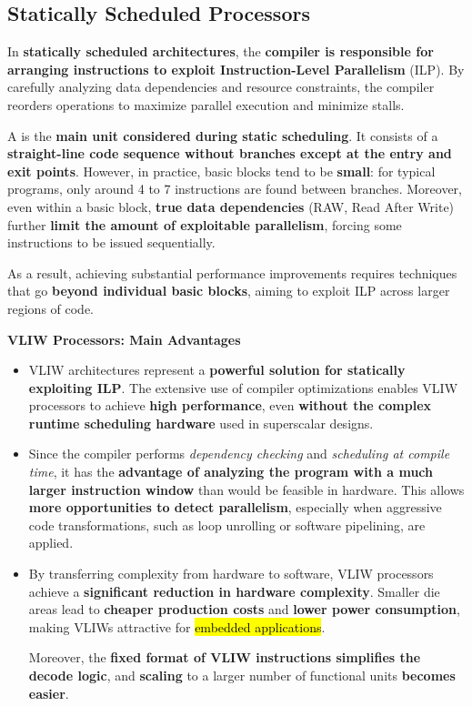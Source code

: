\subsection{Statically Scheduled Processors}

In \textbf{statically scheduled architectures}, the \textbf{compiler is responsible for arranging instructions to exploit Instruction-Level Parallelism} (ILP). By carefully analyzing data dependencies and resource constraints, the compiler reorders operations to maximize parallel execution and minimize stalls.

\highspace
A  is the \textbf{main unit considered during static scheduling}. It consists of a \textbf{straight-line code sequence without branches except at the entry and exit points}. However, in practice, basic blocks tend to be \textbf{small}: for typical programs, only around 4 to 7 instructions are found between branches. Moreover, even within a basic block, \textbf{true data dependencies} (RAW, Read After Write) further \textbf{limit the amount of exploitable parallelism}, forcing some instructions to be issued sequentially.

\highspace
As a result, achieving substantial performance improvements requires techniques that go \textbf{beyond individual basic blocks}, aiming to exploit ILP across larger regions of code.

\highspace
\begin{flushleft}
    \textcolor{Green3}{ \textbf{VLIW Processors: Main Advantages}}
\end{flushleft}
\begin{itemize}
    \item VLIW architectures represent a \textbf{powerful solution for statically exploiting ILP}. The extensive use of compiler optimizations enables VLIW processors to achieve \textbf{high performance}, even \textbf{without the complex runtime scheduling hardware} used in superscalar designs.
    
    \item Since the compiler performs \emph{dependency checking} and \emph{scheduling at compile time}, it has the \textbf{advantage of analyzing the program with a much larger instruction window} than would be feasible in hardware. This allows \textbf{more opportunities to detect parallelism}, especially when aggressive code transformations, such as loop unrolling or software pipelining, are applied.
    
    \item By transferring complexity from hardware to software, VLIW processors achieve a \textbf{significant reduction in hardware complexity}. Smaller die areas lead to \textbf{cheaper production costs} and \textbf{lower power consumption}, making VLIWs attractive for \hl{embedded applications}.
    
    Moreover, the \textbf{fixed format of VLIW instructions simplifies the decode logic}, and \textbf{scaling} to a larger number of functional units \textbf{becomes easier}.
\end{itemize}

